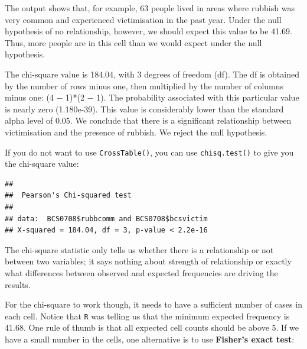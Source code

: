 \documentclass[
]{book}
\newenvironment{Shaded}{\begin{snugshade}}{\end{snugshade}}
\newcommand{\FunctionTok}[1]{\textcolor[rgb]{0.00,0.00,0.00}{#1}}
\newcommand{\NormalTok}[1]{#1}
\newcommand{\SpecialCharTok}[1]{\textcolor[rgb]{0.00,0.00,0.00}{#1}}
\begin{document}
The output shows that, for example, 63 people lived in areas where rubbish was very common and experienced victimisation in the past year. Under the null hypothesis of no relationship, however, we should expect this value to be 41.69. Thus, more people are in this cell than we would expect under the null hypothesis.

The chi-square value is 184.04, with 3 degrees of freedom (df). The df is obtained by the number of rows minus one, then multiplied by the number of columns minus one: (4 − 1)*(2 − 1). The probability associated with this particular value is nearly zero (1.180e-39). This value is considerably lower than the standard alpha level of 0.05. We conclude that there is a significant relationship between victimisation and the presence of rubbish. We reject the null hypothesis.

If you do not want to use \texttt{CrossTable()}, you can use \texttt{chisq.test()} to give you the chi-square value:

\begin{Shaded}
\end{Shaded}

\begin{verbatim}
## 
##  Pearson's Chi-squared test
## 
## data:  BCS0708$rubbcomm and BCS0708$bcsvictim
## X-squared = 184.04, df = 3, p-value < 2.2e-16
\end{verbatim}

The chi-square statistic only tells us whether there is a relationship or not between two variables; it says nothing about strength of relationship or exactly what differences between observed and expected frequencies are driving the results.

For the chi-square to work though, it needs to have a sufficient number of cases in each cell. Notice that \texttt{R} was telling us that the minimum expected frequency is 41.68. One rule of thumb is that all expected cell counts should be above 5. If we have a small number in the cells, one alternative is to use \textbf{Fisher's exact test}:

\begin{Shaded}
\end{Shaded}
\end{document}
